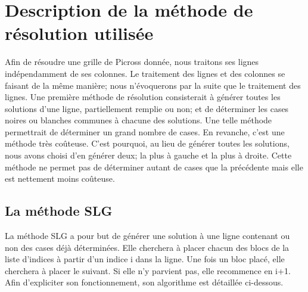 \documentclass{article}
\begin{document}
\section{Description de la méthode de résolution utilisée}
Afin de résoudre une grille de Picross donnée, nous traitons ses lignes indépendamment de ses colonnes. 
Le traitement des lignes et des colonnes se faisant de la même manière; nous n'évoquerons par la suite que le traitement des lignes.
\newline
Une première méthode de résolution consisterait à générer toutes les solutions d'une ligne, partiellement remplie ou non; et de déterminer les cases noires ou blanches communes à chacune des solutions.
\newline
Une telle méthode permettrait de déterminer un grand nombre de cases. En revanche, c'est une méthode très coûteuse.
\newline
C'est pourquoi, au lieu de générer toutes les solutions, nous avons choisi d'en générer deux; la plus à gauche et la plus à droite. Cette méthode ne permet pas de déterminer autant de cases que la précédente mais elle est nettement moins coûteuse.
\subsection{La méthode SLG}
La méthode SLG a pour but de générer une solution à une ligne contenant ou non des cases déjà déterminées.
Elle cherchera à placer chacun des blocs de la liste d'indices à partir d'un indice i dans la ligne.
Une fois un bloc placé, elle cherchera à placer le suivant. Si elle n'y parvient pas, elle recommence en i+1.
Afin d'expliciter son fonctionnement, son algorithme est détaillée ci-dessous.
\end{document}
